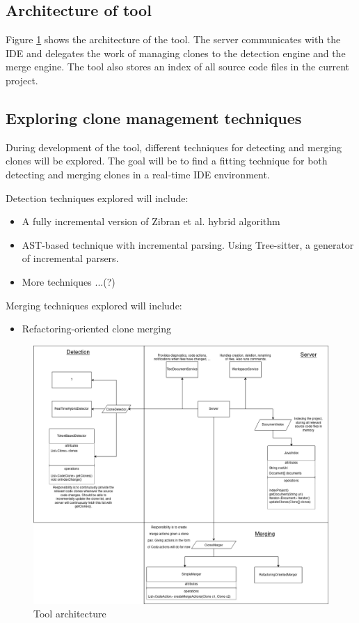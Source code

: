 \documentclass[12pt]{article}
\begin{document}
\subsection{Architecture of tool}

Figure \ref{fig:architecture} shows the architecture of the tool. The server communicates
with the IDE and delegates the work of managing clones to the detection engine and the
merge engine. The tool also stores an index of all source code files in the current project.

\subsection{Exploring clone management techniques}

During development of the tool, different techniques for detecting and merging clones will
be explored. The goal will be to find a fitting technique for both detecting and merging
clones in a real-time IDE environment.

Detection techniques explored will include:

\begin{itemize}
	\item A fully incremental version of Zibran et al. hybrid
	      algorithm\cite{Zibran_real_time_search}
	\item AST-based technique with incremental parsing. Using Tree-sitter, a generator of
	      incremental parsers\cite{treesitter}.
	\item More techniques ...(?)
\end{itemize}

Merging techniques explored will include:

\begin{itemize}
	\item Refactoring-oriented clone merging\cite{RefactoringOrientedClonesAndMerging}
\end{itemize}

\begin{figure}
	\includegraphics[width=\textwidth]{images/ToolArchitecture.png}
	\caption{Tool architecture}
	\label{fig:architecture}
\end{figure}
\end{document}
